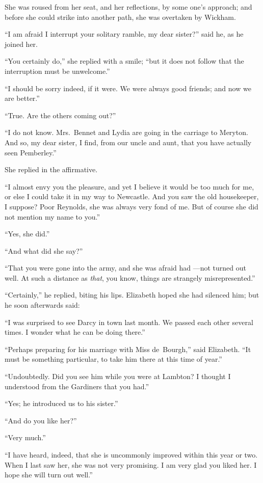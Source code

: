 She was roused from her seat, and her reflections, by some
one's approach; and before she could strike into another path,
she was overtaken by Wickham.

``I am afraid I interrupt your solitary ramble, my dear sister?''
said he, as he joined her.

``You certainly do,'' she replied with a smile; ``but it does not
follow that the interruption must be unwelcome.''

``I should be sorry indeed, if it were.  We were always good
friends; and now we are better.''

``True.  Are the others coming out?''

``I do not know.  Mrs.\ Bennet and Lydia are going in the
carriage to Meryton.  And so, my dear sister, I find, from
our uncle and aunt, that you have actually seen Pemberley.''

She replied in the affirmative.

``I almost envy you the pleasure, and yet I believe it would
be too much for me, or else I could take it in my way to
Newcastle.  And you saw the old housekeeper, I suppose?  Poor
Reynolds, she was always very fond of me.  But of course she
did not mention my name to you.''

``Yes, she did.''

``And what did she say?''

``That you were gone into the army, and she was afraid had
---not turned out well.  At such a distance as \emph{that}, you
know, things are strangely misrepresented.''

``Certainly,'' he replied, biting his lips.  Elizabeth hoped she
had silenced him; but he soon afterwards said:

``I was surprised to see Darcy in town last month.  We passed
each other several times.  I wonder what he can be doing
there.''

``Perhaps preparing for his marriage with Miss de~Bourgh,'' said
Elizabeth.  ``It must be something particular, to take him there
at this time of year.''

``Undoubtedly.  Did you see him while you were at Lambton?
I thought I understood from the Gardiners that you had.''

``Yes; he introduced us to his sister.''

``And do you like her?''

``Very much.''

``I have heard, indeed, that she is uncommonly improved within
this year or two.  When I last saw her, she was not very
promising.  I am very glad you liked her.  I hope she will turn
out well.''

